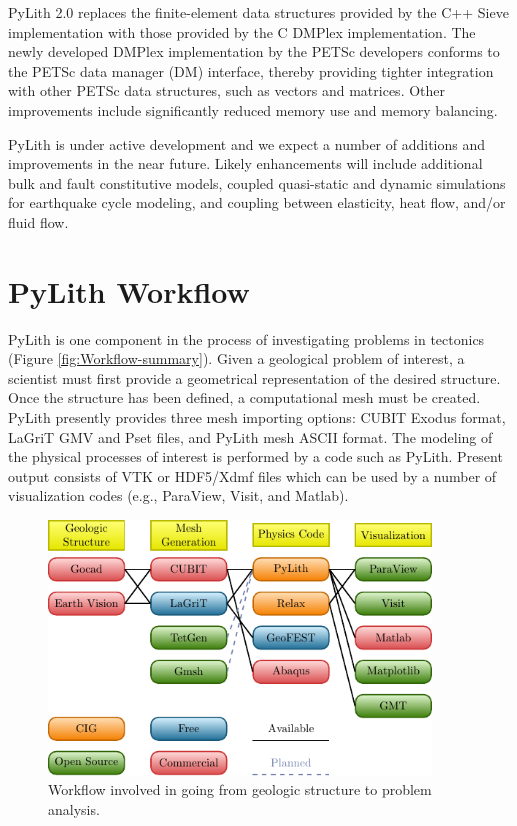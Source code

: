 PyLith 2.0 replaces the finite-element data structures provided by the
C++ Sieve implementation with those provided by the C DMPlex
implementation.  The newly developed DMPlex implementation by the
PETSc developers conforms to the PETSc data manager (DM) interface,
thereby providing tighter integration with other PETSc data
structures, such as vectors and matrices. Other improvements include
significantly reduced memory use and memory balancing.

PyLith is under active development and we expect a number of additions
and improvements in the near future. Likely enhancements will include
additional bulk and fault constitutive models, coupled quasi-static
and dynamic simulations for earthquake cycle modeling, and coupling
between elasticity, heat flow, and/or fluid flow.


\section{PyLith Workflow}

PyLith is one component in the process of investigating problems in
tectonics (Figure \vref{fig:Workflow-summary}). Given a geological
problem of interest, a scientist must first provide a geometrical
representation of the desired structure. Once the structure has been
defined, a computational mesh must be created. PyLith presently
provides three mesh importing options: CUBIT Exodus format, LaGriT GMV
and Pset files, and PyLith mesh ASCII format. The modeling of the
physical processes of interest is performed by a code such as
PyLith. Present output consists of VTK or HDF5/Xdmf files which can be
used by a number of visualization codes (e.g., ParaView, Visit, and
Matlab).

\begin{figure}[htbp]
  \includegraphics[width=4in]{intro/figs/workflow}
  \caption{Workflow involved in going from geologic structure to
    problem analysis.}
  \label{fig:Workflow-summary}
\end{figure}

